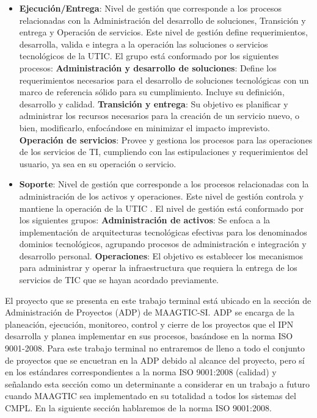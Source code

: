 \begin{itemize}
		\item \textbf{Ejecución/Entrega}: Nivel de gestión que corresponde a los procesos relacionadas con la Administración del desarrollo de soluciones, Transición y entrega y Operación de servicios. Este nivel de gestión define requerimientos, desarrolla, valida e integra a la operación las soluciones o servicios tecnológicos de la UTIC\cite{MAAGTICSIEjecucion}. El grupo está conformado por los siguientes procesos:
			\subitem \textbf{Administración y desarrollo de soluciones}: Define los requerimientos necesarios para el desarrollo de soluciones tecnológicas con un marco de referencia sólido para su cumplimiento. Incluye su definición, desarrollo y calidad\cite{MAAGTICSIEjecucion}.
			\subitem \textbf{Transición y entrega}: Su objetivo es planificar y administrar los recursos necesarios para la creación de un servicio nuevo, o bien, modificarlo, enfocándose en minimizar el impacto imprevisto\cite{MAAGTICSIEjecucion}.
			\subitem \textbf{Operación de servicios}: Provee y gestiona los procesos para las operaciones de los servicios de TI, cumpliendo con las estipulaciones y requerimientos del usuario, ya sea en su operación o servicio\cite{MAAGTICSIEjecucion}.
		\item \textbf{Soporte}: Nivel de gestión que corresponde a los procesos relacionadas con la administración de los activos y operaciones. Este nivel de gestión controla y mantiene la operación de la UTIC \cite{MAAGTICSISoporte}. El nivel de gestión está conformado por los siguientes grupos:
			\subitem \textbf{Administración de activos}: Se enfoca a la implementación de arquitecturas tecnológicas efectivas para los denominados dominios tecnológicos, agrupando procesos de administración e integración y desarrollo personal\cite{MAAGTICSISoporte}.
			\subitem \textbf{Operaciones}: El objetivo es establecer los mecanismos para administrar y operar la infraestructura que requiera la entrega de los servicios de TIC que se hayan acordado previamente\cite{MAAGTICSISoporte}.
	\end{itemize}
	
	El proyecto que se presenta en este trabajo terminal está ubicado en la sección de Administración de Proyectos (ADP) de MAAGTIC-SI. ADP se encarga de la planeación, ejecución, monitoreo, control y cierre de los proyectos que el IPN desarrolla y planea implementar en sus procesos, basándose en la norma ISO 9001-2008. Para este trabajo terminal no entraremos de lleno a todo el conjunto de proyectos que se encuetran en la ADP debido al alcance del proyecto, pero sí en los estándares correspondientes a la norma ISO 9001:2008 (calidad) y señalando esta sección como un determinante a considerar en un trabajo a futuro cuando MAAGTIC sea implementado en su totalidad a todos los sistemas del CMPL. En la siguiente sección hablaremos de la norma ISO 9001:2008.	
	
